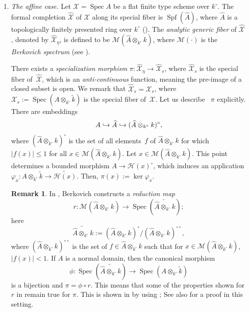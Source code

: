\documentclass[JEP,XML,SOM,Unicode,NoFloatCountersInSection,published]{cedram}
\newcommand{\hto}{\mathrel{\lhook\joinrel\to}}
\DeclareMathOperator{\Spec}{Spec}
\DeclareMathOperator{\Spf}{Spf}
\theoremstyle{definition}
\newtheorem{rem}[thm]{Remark}
\begin{document}
 \label{spec}

\begin{enumerate}
\item\label{para}
\emph{The affine case.}
Let $\mathscr{X}=\Spec A$ be a flat finite type scheme over $k^{\circ}$. The formal completion $\widehat{\mathscr{X}}$ of $\mathscr{X}$ along its special fiber is $\Spf(\widehat{A})$, where $\widehat{A}$ is a topologically finitely presented ring over $k^{\circ}$ (\cf \cite[p.\,541]{ber}). The \textit{analytic generic fiber} of $\widehat{\mathscr{X}}$, denoted by $\widehat{\mathscr{X}}_{\eta}$, is defined to be ${\mathcal{M}(\widehat{A} \otimes_{k^{\circ}} k)}$, where $\mathcal{M}(\cdot)$ is the \textit{Berkovich spectrum} (see \hbox{\cite[1.2]{Ber90}}).

There exists a \textit{specialization morphism} $\pi: \widehat{\mathscr{X}}_{\eta} \to \widehat{\mathscr{X}}_s$, where $\widehat{\mathscr{X}}_s$ is the special fiber of~$\widehat{\mathscr{X}}$, which is an \emph{anti-continuous} function, meaning the pre-image of a closed subset is open. We remark that $\widehat{\mathscr{X}}_s=\mathscr{X}_s$, where $\mathscr{X}_s:=\Spec(A \otimes_{k^{\circ}} \widetilde{k})$ is the special fiber of~$\mathscr{X}$. Let us describe ~$\pi$ explicitly. There are embeddings\vspace*{-3pt}
\[
A \hto \widehat{A} \hto (\widehat{A} \otimes_{k^{\circ}} k)^{\circ},
\]
where $(\widehat{A} \otimes_{k^{\circ}} k)^{\circ}$ is the set of all elements~$f$ of $\widehat{A} \otimes_{k^{\circ}} k$ for which $|f(x)| \leqslant 1$ for all $x \!\in\! \mathcal{M}(\widehat{A} \otimes_{k^{\circ}} k)$. Let $x \!\in\! \mathcal{M}(\widehat{A} \otimes_{k^{\circ}} k)$. This point determines a bounded morphism $A \!\to\! \mathcal{H}(x)^{\circ}$, which induces an application ${\varphi_x : A \otimes_{k^{\circ}} \widetilde{k} \to \widetilde{\mathcal{H}(x)}}$. Then, $\pi(x):=\ker{\varphi_x}$.

\begin{rem} \label{berred}
In \cite[2.4]{Ber90}, Berkovich constructs a \emph{reduction map}
\[
r : \mathcal{M}(\widehat{A} \otimes_{k^{\circ}} k) \to \Spec(\widetilde{\widehat{A} \otimes_{k^{\circ}} k});
\]
here
\[
\widetilde{\widehat{A} \otimes_{k^{\circ}} k}:=(\widehat{A} \otimes_{k^{\circ}} k)^{\circ}/(\widehat{A} \otimes_{k^{\circ}} k)^{\circ\circ},
\]
where $(\widehat{A} \otimes_{k^{\circ}} k)^{\circ\circ}$ is the set of $f \in \widehat{A} \otimes_{k^{\circ}} k$ such that for $x \in \mathcal{M}(\widehat{A} \otimes_{k^{\circ}} k)$, $|f(x)|<1$. If $A$ is a normal domain, then the canonical morphism
\[
\phi: \Spec(\widetilde{\widehat{A} \otimes_{k^{\circ}} k}) \to \Spec(A \otimes_{k^{\circ}} \widetilde{k})
\]
is a bijection and $\pi=\phi \circ r$. This means that some of the properties shown for $r$ in \cite[2.4]{Ber90} remain true for $\pi$. This is shown in \cite[Rem.\,4.8]{mart} by using \cite[Th.\,2.1]{mart}; See also \cite[Prop.\,4.1]{une} for a proof in this setting.
\end{rem}


\end{enumerate}
\end{document}
